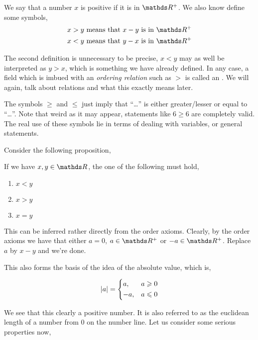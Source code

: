 We say that a number \(x\) is positive if it is in \(\RR^+\). We also know define some symbols, 
\begin{align*}
    x > y \text{ means that } x - y \text{ is in } \RR^+ \\
    x < y \text{ means that } y - x \text{ is in } \RR^+ 
\end{align*}

The second definition is unnecessary to be precise, \(x < y\) may as well be 
interpreted as \(y > x\), which is something we have already defined. In any case, 
a field which is imbued with an \emph{ordering relation} such as \(>\) is called 
an . We will again, talk about relations and what this exactly 
means later.

The symbols \(\ge\) and \(\le\) just imply that ``\dots'' is either greater/lesser or equal to ``\dots''.
Note that weird as it may appear, statements like \(6 \ge 6\) are completely valid. 
The real use of these symbols lie in terms of dealing with variables, or general 
statements.

Consider the following proposition, 

\begin{plainprop}[Trichotomy]
    If we have \(x, y \in \RR\), the one of the following must hold, 
    \begin{enumerate}
        \item \(x < y\)
        \item \(x > y\)
        \item \(x = y\)
    \end{enumerate}
\end{plainprop}

This can be inferred rather directly from the order axioms. Clearly, by the order 
axioms we have that either \(a = 0\), \(a \in \RR^+\) or \(-a \in \RR^+\).
Replace \(a\) by \(x - y\) and we're done.

This also forms the basis of the idea of the absolute value, which is, 

\begin{equation}
    \abs{a} = 
    \begin{dcases}
        a, & a \geqslant 0 \\
        -a, & a \leqslant 0
    \end{dcases}
\end{equation}

We see that this clearly a positive number. It is also referred to as the euclidean length of 
a number from \(0\) on the number line. Let us consider some serious properties now, 

